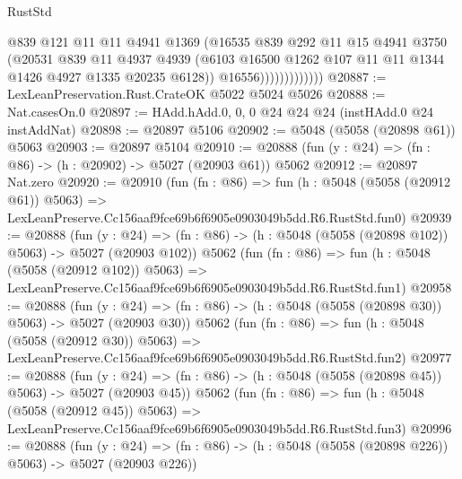 \begin{lexlean}{RustStd}
\begin{coremodule}
                            @839
                            @121
                            @11
                            @11
                            @4941
                            @1369
                            (@16535
                              @839
                              @292
                              @11
                              @15
                              @4941
                              @3750
                              (@20531
                                @839
                                @11
                                @4937
                                @4939
                                (@6103
                                  @16500
                                  @1262
                                  @107
                                  @11
                                  @11
                                  @1344
                                  @1426
                                  @4927
                                  @1335
                                  @20235
                                  @6128))
                              @16556)))))))))))))
@20887 := LexLeanPreservation.Rust.CrateOK @5022 @5024 @5026
@20888 := Nat.casesOn.{0}
@20897 := HAdd.hAdd.{0, 0, 0} @24 @24 @24 (instHAdd.{0} @24 instAddNat)
@20898 := @20897 @5106
@20902 := @5048 (@5058 (@20898 @61)) @5063
@20903 := @20897 @5104
@20910 := @20888 (fun (y : @24) => (fn : @86) -> (h : @20902) -> @5027 (@20903 @61)) @5062
@20912 := @20897 Nat.zero
@20920 := @20910
    (fun (fn : @86) =>
    fun (h : @5048 (@5058 (@20912 @61)) @5063) =>
    LexLeanPreserve.Cc156aaf9fce69b6f6905e0903049b5dd.R6.RustStd.fun0)
@20939 := @20888
    (fun (y : @24) => (fn : @86) -> (h : @5048 (@5058 (@20898 @102)) @5063) -> @5027 (@20903 @102))
    @5062
    (fun (fn : @86) =>
    fun (h : @5048 (@5058 (@20912 @102)) @5063) =>
    LexLeanPreserve.Cc156aaf9fce69b6f6905e0903049b5dd.R6.RustStd.fun1)
@20958 := @20888
    (fun (y : @24) => (fn : @86) -> (h : @5048 (@5058 (@20898 @30)) @5063) -> @5027 (@20903 @30))
    @5062
    (fun (fn : @86) =>
    fun (h : @5048 (@5058 (@20912 @30)) @5063) =>
    LexLeanPreserve.Cc156aaf9fce69b6f6905e0903049b5dd.R6.RustStd.fun2)
@20977 := @20888
    (fun (y : @24) => (fn : @86) -> (h : @5048 (@5058 (@20898 @45)) @5063) -> @5027 (@20903 @45))
    @5062
    (fun (fn : @86) =>
    fun (h : @5048 (@5058 (@20912 @45)) @5063) =>
    LexLeanPreserve.Cc156aaf9fce69b6f6905e0903049b5dd.R6.RustStd.fun3)
@20996 := @20888
    (fun (y : @24) => (fn : @86) -> (h : @5048 (@5058 (@20898 @226)) @5063) -> @5027 (@20903 @226))

\end{coremodule}
\end{lexlean}
